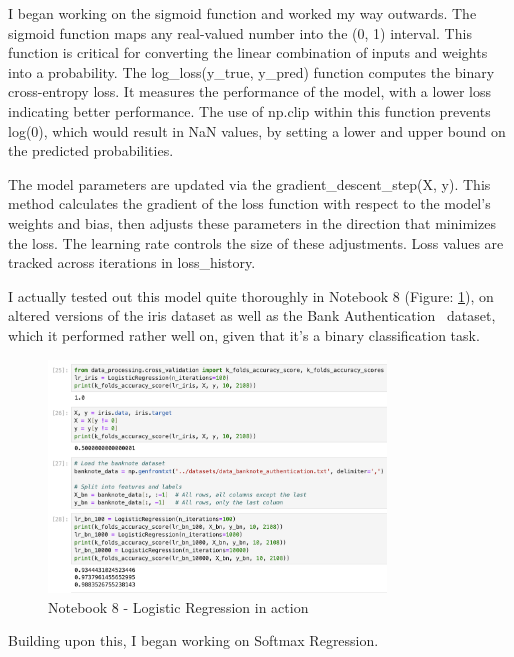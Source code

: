 \documentclass[letterpaper,10pt]{article}
\begin{document}
I began working on the sigmoid function and worked my way outwards. The sigmoid function maps any real-valued number into the (0, 1) interval. This function is critical for converting the linear combination of inputs and weights into a probability. The log\_loss(y\_true, y\_pred) function computes the binary cross-entropy loss. It measures the performance of the model, with a lower loss indicating better performance. The use of np.clip within this function prevents log(0), which would result in NaN values, by setting a lower and upper bound on the predicted probabilities. \par
The model parameters are updated via the gradient\_descent\_step(X, y). This method calculates the gradient of the loss function with respect to the model's weights and bias, then adjusts these parameters in the direction that minimizes the loss. The learning rate controls the size of these adjustments. Loss values are tracked across iterations in loss\_history. \par

I actually tested out this model quite thoroughly in Notebook 8 (Figure: \ref{fig:notebook_8_1}), on altered versions of the iris dataset as well as the Bank Authentication~\cite{banknote_authentication} dataset, which it performed rather well on, given that it's a binary classification task. 

\begin{figure}[ht]
    \centering
    \includegraphics[width=0.8\textwidth]{notebook_8_bank.png}
    \caption{Notebook 8 - Logistic Regression in action}
    \label{fig:notebook_8_1}
\end{figure}

Building upon this, I began working on Softmax Regression. 
\end{document}
